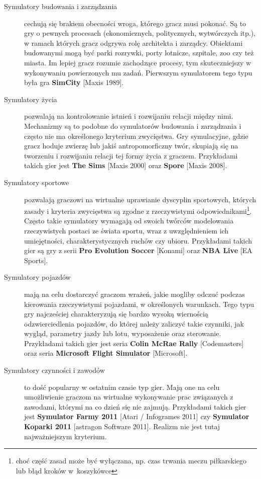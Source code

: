 \begin{description}
	\item[Symulatory budowania i zarządzania] cechują się brakiem obecności wroga, którego gracz musi pokonać. Są to gry o pewnych procesach (ekonomicznych, politycznych, wytwórczych itp.), w ramach których gracz odgrywa rolę architekta i zarządcy. Obiektami budowanymi mogą być parki rozrywki, porty lotnicze, szpitale, zoo czy też miasta. Im lepiej gracz rozumie zachodzące procesy, tym skuteczniejszy w wykonywaniu powierzonych mu zadań. Pierwszym symulatorem tego typu była gra \textbf{SimCity} [Maxis 1989].
	\item[Symulatory życia] pozwalają na kontrolowanie istnień i rozwijaniu relacji między nimi. Mechanizmy są to podobne do symulatorów budowania i zarządzania i często nie ma określonego kryterium zwycięstwa. Gry symulacyjne, gdzie gracz hoduje zwierzę lub jakiś antropomorficzny twór, skupiają się na tworzeniu i rozwijaniu relacji tej formy życia z graczem. Przykładami takich gier jest \textbf{The Sims} [Maxis 2000] oraz \textbf{Spore} [Maxis 2008].
	\item[Symulatory sportowe] pozwalają graczowi na wirtualne uprawianie dyscyplin sportowych, których zasady i kryteria zwycięstwa są zgodne z rzeczywistymi odpowiednikami\footnote{choć część zasad może być wyłączana, np. czas trwania meczu piłkarskiego lub błąd kroków w~koszykówce}. Często takie symulatory wymagają od swoich twórców modelowania rzeczywistych postaci ze świata sportu, wraz z uwzględnieniem ich umiejętności, charakterystycznych ruchów czy ubioru. Przykładami takich gier są gry z serii \textbf{Pro Evolution Soccer} [Konami] oraz \textbf{NBA Live} [EA Sports].
	\item[Symulatory pojazdów] mają na celu dostarczyć graczom wrażeń, jakie mogliby odczuć podczas kierowania rzeczywistymi pojazdami, w określonych warunkach. Tego typu gry najcześciej charakteryzują się bardzo wysoką wiernością odzwierciedlenia pojazdów, do której należy zaliczyć takie czynniki, jak wygląd, parametry jazdy lub lotu, wyposażenie oraz sterowanie. Przykładami takich gier jest seria \textbf{Colin McRae Rally} [Codemasters] oraz seria \textbf{Microsoft Flight Simulator} [Microsoft].
	\item[Symulatory czynności i zawodów] to dość popularny w ostatnim czasie typ gier. Mają one na celu umożliwienie graczom na wirtualne wykonywanie prac związanych z zawodami, którymi na co dzień się nie zajmują. Przykładami takich gier jest \textbf{Symulator Farmy 2011} [Atari / Infogrames 2011] czy \textbf{Symulator Koparki 2011} [astragon Software 2011]. Realizm nie jest tutaj najważniejszym kryterium.
\end{description}

